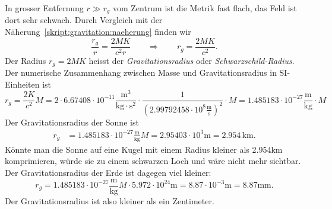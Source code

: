 In grosser Entfernung $r \gg r_g$ vom Zentrum ist die Metrik fast flach,
das Feld ist dort sehr schwach.
Durch Vergleich mit der Näherung~\eqref{skript:gravitation:naeherung}
finden wir
\[
\frac{r_g}{r} = \frac{2MK}{c^2r}
\qquad\Rightarrow\qquad
r_g=\frac{2MK}{c^2}.
\]
Der Radius $r_g=2MK$ heisst der {\em Gravitationsradius} oder 
%
{\em Schwarzschild-Radius}.
%
Der numerische Zusammenhang zwischen Masse und Gravitationsradius
in SI-Einheiten ist
\[
r_g = \frac{2K}{c^2}M
=
2\cdot 6.67408\cdot10^{-11}
\frac{\text{m}^3}{\text{kg}\cdot\text{s}^2}
\cdot
\frac1{(2.99792458\cdot 10^{8}\frac{\text{m}}{\text{s}})^2}\cdot M
=
1.485183\cdot 10^{-27}\frac{\text{m}}{\text{kg}}\cdot M
\]
Der Gravitationsradius der Sonne ist 
\begin{align*}
r_g
&=
1.485183\cdot 10^{-27}\frac{\text{m}}{\text{kg}}M
=
2.95403\cdot 10^{3}\text{m}
=
2.954\,\text{km}.
\end{align*}
Könnte man die Sonne auf eine Kugel mit einem Radius kleiner als 2.954km
komprimieren, würde sie zu einem schwarzen Loch und wäre nicht mehr
sichtbar.
Der Gravitationsradius der Erde ist dagegen viel kleiner:
\[
r_g
=
1.485183\cdot 10^{-27}\frac{\text{m}}{\text{kg}}M
\cdot
5.972\cdot 10^{24}\text{m}
=
8.87\cdot 10^{-3}\text{m}
=
8.87\text{mm}.
\]
Der Gravitationsradius ist also kleiner als ein Zentimeter.




